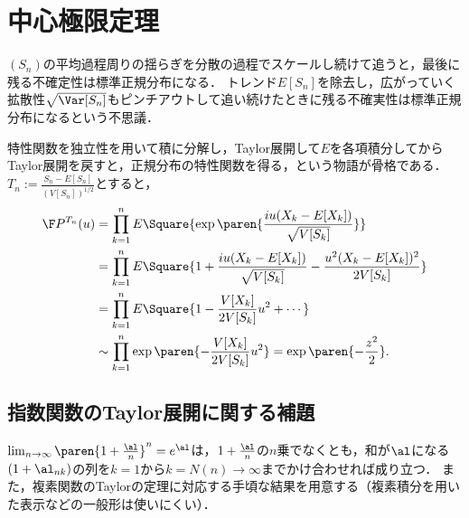 \documentclass[uplatex,dvipdfmx]{jsreport}
\begin{document}
\section{中心極限定理}

\begin{tcolorbox}[colframe=ForestGreen, colback=ForestGreen!10!white,breakable,colbacktitle=ForestGreen!40!white,coltitle=black,fonttitle=\bfseries\sffamily,
title=]
    $(S_n)$の平均過程周りの揺らぎを分散の過程でスケールし続けて追うと，最後に残る不確定性は標準正規分布になる．
    トレンド$E[S_n]$を除去し，広がっていく拡散性$\sqrt{\Var[S_n]}$もピンチアウトして追い続けたときに残る不確実性は標準正規分布になるという不思議．
\end{tcolorbox}

\begin{remarks}[議論の中核]
    特性関数を独立性を用いて積に分解し，Taylor展開して$E$を各項積分してからTaylor展開を戻すと，正規分布の特性関数を得る，という物語が骨格である．
    $T_n:=\frac{S_n-E[S_n]}{(V[S_n])^{1/2}}$とすると，
    \begin{align*}
        \F P^{T_n}(u)&=\prod^n_{k=1}E\Square{\exp\paren{\frac{iu(X_k-E[X_k])}{\sqrt{V[S_k]}}}}\\
        &=\prod^n_{k=1}E\Square{1+\frac{iu(X_k-E[X_k])}{\sqrt{V[S_k]}}-\frac{u^2(X_k-E[X_k])^2}{2V[S_k]}}\\
        &=\prod^n_{k=1}E\Square{1-\frac{V[X_k]}{2V[S_k]}u^2+\cdots}\\
        &\sim\prod_{k=1}^n\exp\paren{-\frac{V[X_k]}{2V[S_k]}u^2}=\exp\paren{-\frac{z^2}{2}}.
    \end{align*}
\end{remarks}

\subsection{指数関数のTaylor展開に関する補題}

\begin{tcolorbox}[colframe=ForestGreen, colback=ForestGreen!10!white,breakable,colbacktitle=ForestGreen!40!white,coltitle=black,fonttitle=\bfseries\sffamily,
title=]
    $\lim_{n\to\infty}\paren{1+\frac{\al}{n}}^n=e^\al$は，$1+\frac{\al}{n}$の$n$乗でなくとも，和が$\al$になる$(1+\al_{nk})$の列を$k=1$から$k=N(n)\to\infty$までかけ合わせれば成り立つ．
    また，複素関数のTaylorの定理に対応する手頃な結果を用意する（複素積分を用いた表示などの一般形は使いにくい）．
\end{tcolorbox}
\end{document}
